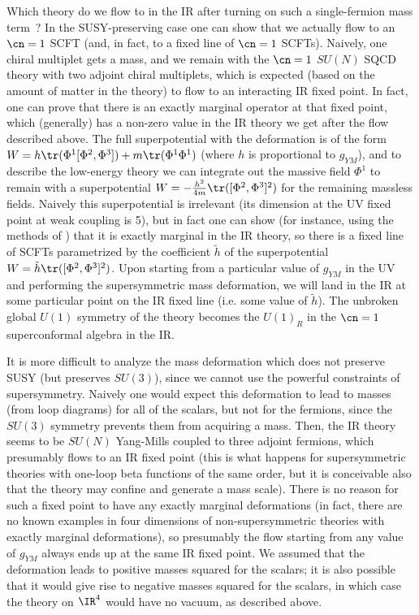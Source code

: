  Which theory do we flow to in the IR after turning on such a
 single-fermion mass term~? In the SUSY-preserving case one can show
 that we actually flow to an $\cn=1$ SCFT (and, in fact, to a fixed
 line of $\cn=1$ SCFTs). Naively, one chiral multiplet gets a mass,
 and we remain with the $\cn=1$ $SU(N)$ SQCD theory with two adjoint
 chiral multiplets, which is expected (based on the amount of matter
 in the theory) to flow to an interacting IR fixed point. In fact, one
 can prove \cite{Karch:1999pv} that there is an exactly marginal
 operator at that fixed point, which (generally) has a non-zero value
 in the IR theory we get after the flow described above. The full
 superpotential with the deformation is of the form $W = h\tr(\Phi^1
 [\Phi^2, \Phi^3]) + m\tr(\Phi^1 \Phi^1)$ (where $h$ is proportional
 to $g_{YM}$), and to describe the low-energy theory we can integrate
 out the massive field $\Phi^1$ to remain with a superpotential $W =
 -{h^2\over 4m} \tr([\Phi^2, \Phi^3]^2)$ for the remaining massless
 fields. Naively this superpotential is irrelevant (its dimension at
 the UV fixed point at weak coupling is 5), but in fact one can show
 (for instance, using the methods of \cite{Leigh:1995ep}) that it is
 exactly marginal in the IR theory, so there is a fixed line of SCFTs
 parametrized by the coefficient $\tilde h$ of the superpotential $W =
 {\tilde h} \tr([\Phi^2,\Phi^3]^2)$. Upon starting from a particular
 value of $g_{YM}$ in the UV and performing the supersymmetric mass
 deformation, we will land in the IR at some particular point on the
 IR fixed line (i.e. some value of $\tilde h$). The unbroken global
 $U(1)$ symmetry of the theory becomes the $U(1)_R$ in the $\cn=1$
 superconformal algebra in the IR.

 It is more difficult to analyze the mass deformation which does not
 preserve SUSY (but preserves $SU(3)$), since we cannot use the
 powerful constraints of supersymmetry. Naively one would expect this
 deformation to lead to masses (from loop diagrams) for all of the
 scalars, but not for the fermions, since the $SU(3)$ symmetry
 prevents them from acquiring a mass. Then, the IR theory seems to be
 $SU(N)$ Yang-Mills coupled to three adjoint fermions, which
 presumably flows to an IR fixed point (this is what happens for
 supersymmetric theories with one-loop beta functions of the same
 order, but it is conceivable also that the theory may confine and
 generate a mass scale). There is no reason for such a fixed point to
 have any exactly marginal deformations (in fact, there are no known
 examples in four dimensions of non-supersymmetric theories with
 exactly marginal deformations), so presumably the flow starting from
 any value of $g_{YM}$ always ends up at the same IR fixed point. We
 assumed that the deformation leads to positive masses squared for the
 scalars; it is also possible that it would give rise to negative
 masses squared for the scalars, in which case the theory on $\IR^4$
 would have no vacuum, as described above.

